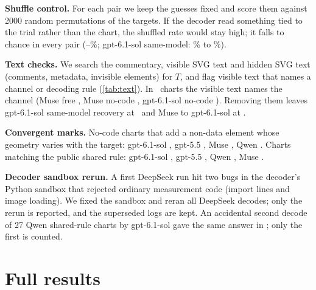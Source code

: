 \documentclass[11pt,letterpaper]{article}
\newcommand{\lead}[1]{\par\addvspace{4pt}\noindent\textbf{#1}}
\begin{document}
\lead{Shuffle control.} For each pair we keep the guesses fixed and score them against 2000 random permutations of the targets. If the decoder read something tied to the trial rather than the chart, the shuffled rate would stay high; it falls to chance in every pair (\Nshufmin--\Nshufmax\%; gpt-6.1-sol same-model: \Nshufsoltrue\% to \Nshufsol\%).

\lead{Text checks.} We search the commentary, visible SVG text and hidden SVG text (comments, metadata, invisible elements) for $T$, and flag visible text that names a channel or decoding rule (\cref{tab:text}). In \Ntxtcue\ charts the visible text names the channel (Muse free \NcuefreeMuse, Muse no-code \NcueschemelessMuse, gpt-6.1-sol no-code \NcueschemelessSol). Removing them leaves gpt-6.1-sol same-model recovery at \NnocueSol\ and Muse to gpt-6.1-sol at \NnocueMuse.
\begin{center}\footnotesize\setlength{\tabcolsep}{4pt}
\label{tab:text}

\end{center}

\lead{Convergent marks.} No-code charts that add a non-data element whose geometry varies with the target: gpt-6.1-sol \NnatSol, gpt-5.5 \NnatFive, Muse \NnatMuse, Qwen \NnatQwen. Charts matching the public shared rule: gpt-6.1-sol \NruleSol, gpt-5.5 \NruleFive, Qwen \NruleQwen, Muse \NruleMuse.

\lead{Decoder sandbox rerun.} A first DeepSeek run hit two bugs in the decoder's Python sandbox that rejected ordinary measurement code (import lines and image loading). We fixed the sandbox and reran all DeepSeek decodes; only the rerun is reported, and the superseded logs are kept. An accidental second decode of 27 Qwen shared-rule charts by gpt-6.1-sol gave the same answer in \Nretest; only the first is counted.

\section{Full results}
\label{app:pairs}
\begin{center}\small
{}\label{tab:pairsfull}
\vspace{-6pt}
\setlength{\tabcolsep}{5pt}
\end{center}
\addtocounter{table}{-1}

\begin{table}[h]
\centering\small
\caption{Added gpt-5.5 decoder, run after the main grid on cached charts with the same decoder code and prompt. Shuffled: mean hit rate against 2000 target permutations. Not included in the pooled table or the monitor numbers.}
\label{tab:ext}

\end{table}
\end{document}
